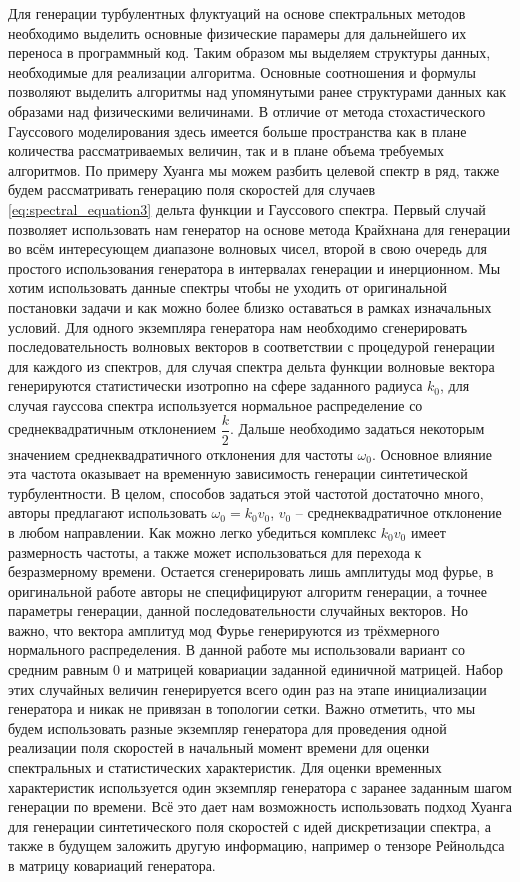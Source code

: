 Для генерации турбулентных флуктуаций на основе спектральных методов необходимо выделить основные физические парамеры для дальнейшего их переноса в программный код. Таким образом мы выделяем структуры данных, необходимые для реализации алгоритма. Основные соотношения и формулы позволяют выделить алгоритмы над упомянутыми ранее структурами данных как образами над физическими величинами. В отличие от метода стохастического Гауссового моделирования здесь имеется больше пространства как в плане количества рассматриваемых величин, так и в плане объема требуемых алгоритмов. По примеру Хуанга мы можем разбить целевой спектр в ряд, также будем рассматривать генерацию поля скоростей для случаев \ref{eq:spectral_equation3} дельта функции и Гауссового спектра. Первый случай позволяет использовать нам генератор на основе метода Крайхнана для генерации во всём интересующем диапазоне волновых чисел, второй в свою очередь для простого использования генератора в интервалах генерации и инерционном. Мы хотим использовать данные спектры чтобы не уходить от оригинальной постановки задачи и как можно более близко оставаться в рамках изначальных условий. Для одного экземпляра генератора нам необходимо сгенерировать последовательность волновых векторов в соответствии с процедурой генерации для каждого из спектров, для случая спектра дельта функции волновые вектора генерируются статистически изотропно на сфере заданного радиуса $k_0$, для случая гауссова спектра используется нормальное распределение со среднеквадратичным отклонением $\dfrac{k}{2}$. Дальше необходимо задаться некоторым значением среднеквадратичного отклонения для частоты $\omega_0$. Основное влияние эта частота оказывает на временную зависимость генерации синтетической турбулентности. В целом, способов задаться этой частотой достаточно много, авторы предлагают использовать $\omega_0 = k_0 v_0$, $v_0$ -- среднеквадратичное отклонение в любом направлении. Как можно легко убедиться комплекс $k_0 v_0$ имеет размерность частоты, а также может использоваться для перехода к безразмерному времени. Остается сгенерировать лишь амплитуды мод фурье, в оригинальной работе авторы не специфицируют алгоритм генерации, а точнее параметры генерации, данной последовательности случайных векторов. Но важно, что вектора амплитуд мод Фурье генерируются из трёхмерного нормального распределения. В данной работе мы использовали вариант со средним равным 0 и матрицей ковариации заданной единичной матрицей. Набор этих случайных величин генерируется всего один раз на этапе инициализации генератора и никак не привязан в топологии сетки. Важно отметить, что мы будем использовать разные экземпляр генератора для проведения одной реализации поля скоростей в начальный момент времени для оценки спектральных и статистических характеристик. Для оценки временных характеристик используется один экземпляр генератора с заранее заданным шагом генерации по времени. 
Всё это дает нам возможность использовать подход Хуанга для генерации синтетического поля скоростей с идей дискретизации спектра, а также в будущем заложить другую информацию, например о тензоре Рейнольдса в матрицу ковариаций генератора. 

